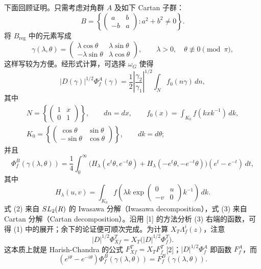 下面回顾证明。只需考虑对角群 $A$ 及如下 Cartan 子群：
\[
 B=\left\{\begin{pmatrix}a&b\\-b&a\end{pmatrix}:a^2+b^2\ne0\right\}.
\]
将 $B_{\mathrm{reg}}$ 中的元素写成
\[
 \gamma(\lambda,\theta)=\begin{pmatrix}\lambda\cos\theta&\lambda\sin\theta\\-\lambda\sin\theta&\lambda\cos\theta\end{pmatrix},
 \qquad\lambda>0,\quad\theta\not\equiv0\pmod\pi,
\]
这样写较为方便。经形式计算，可选择 $\omega_G$ 使得
\begin{equation}
 |D(\gamma)|^{1/2}\Phi_f^A(\gamma)
 =\frac12\left|\frac{\gamma_2}{\gamma_1}\right|^{1/2}\int_N f_0(n\gamma)\,dn,
 \tag{2}
\end{equation}
其中
\[
 \begin{gathered}
 N=\left\{\begin{pmatrix}1&x\\0&1\end{pmatrix}\right\},\qquad dn=dx,
 \qquad f_0(x)=\int_{K_0}f(kxk^{-1})\,dk,\\
 K_0=\left\{\begin{pmatrix}\cos\theta&\sin\theta\\-\sin\theta&\cos\theta\end{pmatrix}\right\},\qquad dk=d\theta;
 \end{gathered}
\]
并且
\begin{equation}
 \Phi_f^B(\gamma(\lambda,\theta))=
 \frac14\int_0^\infty
 \bigl(H_\lambda(e^t\theta,e^{-t}\theta)+H_\lambda(-e^t\theta,-e^{-t}\theta)\bigr)(e^t-e^{-t})\,dt,
 \tag{3}
\end{equation}
其中
\[
 H_\lambda(u,v)=\int_{K_0} f\left(\lambda k\exp\begin{pmatrix}0&u\\-v&0\end{pmatrix}k^{-1}\right)\,dk.
\]
式 (2) 来自 $SL_2(R)$ 的 Iwasawa 分解（Iwasawa decomposition），式 (3) 来自 Cartan 分解（Cartan decomposition）。沿用 [1] 的方法分析 (3) 右端的函数，可得 (1) 中的展开；余下的论证便可顺次完成。为计算 $X_T\Lambda_f^i(z)$，注意
\[
 |D|^{1/2}\Phi_{Xf}^T=X_T\bigl(|D|^{1/2}\Phi_f^T\bigr).
\]
这本质上就是 Harish-Chandra 的公式 $F_{Xf}^T=X_TF_f^T$ [2]；$|D|^{1/2}\Phi_f^A$ 即函数 $F_f^A$，而
\[
 (e^{i\theta}-e^{-i\theta})\Phi_f^B(\gamma(\lambda,\theta))=F_f^B(\gamma(\lambda,\theta)).
\]

